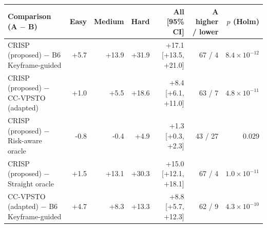 \begin{tabular}{lrrrrrr}
\toprule
Comparison (A $-$ B) & Easy & Medium & Hard & All [95\% CI] & A higher / lower & $p$ (Holm) \\
\midrule
CRISP (proposed) $-$ B6 Keyframe-guided & +5.7 & +13.9 & +31.9 & +17.1 [+13.5, +21.0] & 67 / 4 & $8.4\times10^{-12}$ \\
CRISP (proposed) $-$ CC-VPSTO (adapted) & +1.0 & +5.5 & +18.6 & +8.4 [+6.1, +11.0] & 63 / 7 & $4.8\times10^{-11}$ \\
CRISP (proposed) $-$ Risk-aware oracle & -0.8 & -0.4 & +4.9 & +1.3 [+0.3, +2.3] & 43 / 27 & 0.029 \\
CRISP (proposed) $-$ Straight oracle & +1.5 & +13.1 & +30.3 & +15.0 [+12.1, +18.1] & 67 / 4 & $1.0\times10^{-11}$ \\
CC-VPSTO (adapted) $-$ B6 Keyframe-guided & +4.7 & +8.3 & +13.3 & +8.8 [+5.7, +12.3] & 62 / 9 & $4.3\times10^{-10}$ \\
\bottomrule
\end{tabular}
